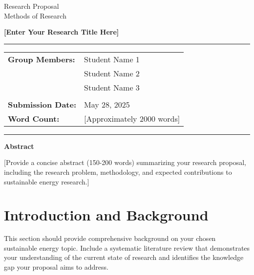\documentclass[12pt,a4paper]{article}
\newcommand{\studentone}{Student Name 1}
\newcommand{\studenttwo}{Student Name 2}
\newcommand{\studentthree}{Student Name 3}
\newcommand{\projecttitle}{[Enter Your Research Title Here]}
\newcommand{\submissiondate}{May 28, 2025}
\begin{document}
\begin{titlepage}
\begin{center}
{\Huge{Research Proposal}} \\
\vspace{5mm}
{\Large{Methods of Research}} \\

\vspace{10mm}

{\huge{\textbf{\projecttitle}}} \\

\vspace{15mm}

\hrule
\vspace{3mm}
\begin{tabular}{ll}
\textbf{Group Members:} & {\studentone} \\
& {\studenttwo} \\
& {\studentthree} \\
\\
\textbf{Submission Date:} & {\submissiondate} \\
\textbf{Word Count:} & [Approximately 2000 words] \\
\end{tabular}
\vspace{3mm}
\hrule

\vspace{15mm}

\textbf{Abstract} \\
\vspace{2mm}
\begin{minipage}{0.8\textwidth}
[Provide a concise abstract (150-200 words) summarizing your research proposal, including the research problem, methodology, and expected contributions to sustainable energy research.]
\end{minipage}

\end{center}
\end{titlepage}

\tableofcontents
\newpage

\section{Introduction and Background}
\label{sec:background}

This section should provide comprehensive background on your chosen sustainable energy topic. Include a systematic literature review that demonstrates your understanding of the current state of research and identifies the knowledge gap your proposal aims to address.
\end{document}
